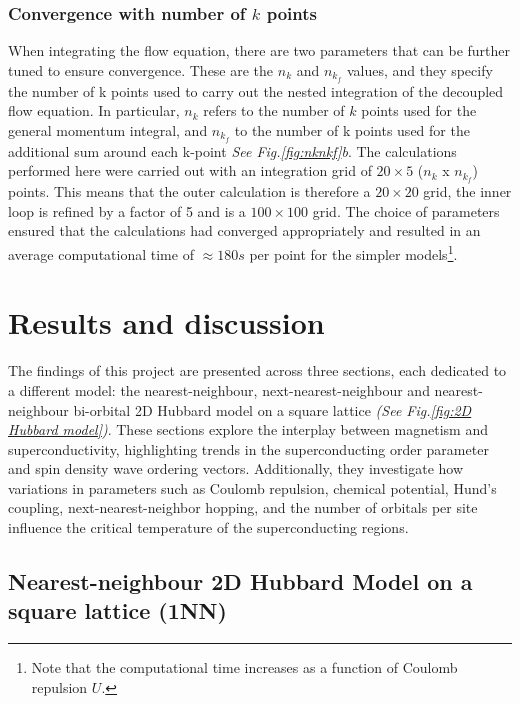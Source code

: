 \documentclass[12pt]{article}
\begin{document}
\subsubsection{Convergence with number of $k$ points }

When integrating the flow equation, there are two parameters that can be further tuned to ensure convergence.
These are the $n_k$ and $n_{k_f}$ values, and they specify the number of k points used to carry out the nested integration of the decoupled flow equation. 
In particular, $n_k$ refers to the number of $k$ points used for the general momentum integral, and $n_{k_f}$ to the number of k points used for 
the additional sum around each k-point \textit{See Fig.\ref{fig:nknkf}b}. The calculations performed here were carried out with an integration 
grid of $20 \times 5$ ($n_k$ x $n_{k_f}$) points. This means that the outer calculation is therefore a $20\times20$ grid, the inner loop is refined by a factor
of 5 and is a $100 \times 100$ grid. The choice of parameters ensured that the calculations had converged appropriately 
and resulted in an average computational time of $\approx 180s$ per point for the simpler models\footnote{Note that the computational time increases as a function of Coulomb repulsion $U$. }. 


\section{Results and discussion}

The findings of this project are presented across three sections, each dedicated to 
a different model: the nearest-neighbour, next-nearest-neighbour and nearest-neighbour
bi-orbital 2D Hubbard model on a square lattice \textit{(See Fig.\ref{fig:2D Hubbard model})}. 
These sections explore the interplay between magnetism and superconductivity, 
highlighting trends in the superconducting order parameter and spin density wave
ordering vectors. Additionally, they investigate how variations in parameters such as 
Coulomb repulsion, chemical potential, Hund's coupling, next-nearest-neighbor hopping, and the number of orbitals per site 
influence the critical temperature of the superconducting regions.

\subsection{Nearest-neighbour 2D Hubbard Model on a square lattice (1NN)}
\label{subsec:1NNModel}
\end{document}

